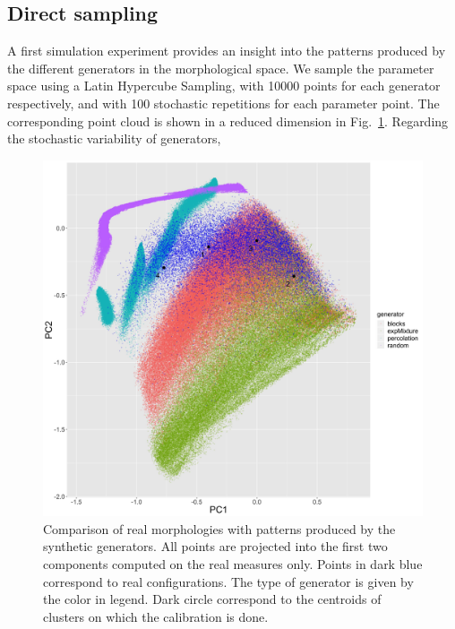 \documentclass[letterpaper]{article}
\begin{document}
\subsection{Direct sampling}

A first simulation experiment provides an insight into the patterns produced by the different generators in the morphological space. We sample the parameter space using a Latin Hypercube Sampling, with 10000 points for each generator respectively, and with 100 stochastic repetitions for each parameter point. The corresponding point cloud is shown in a reduced dimension in Fig.~\ref{fig:lhs}.
Regarding the stochastic variability of generators, %



\begin{figure}
    \centering
    \includegraphics[width=\linewidth]{lhscalib_projrealpcs}
    \caption{Comparison of real morphologies with patterns produced by the synthetic generators. All points are projected into the first two components computed on the real measures only. Points in dark blue correspond to real configurations. The type of generator is given by the color in legend. Dark circle correspond to the centroids of clusters on which the calibration is done.}
    \label{fig:lhs}
\end{figure}
\end{document}
